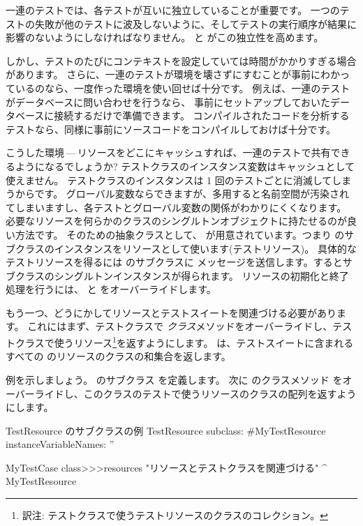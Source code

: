 \documentclass[a4paper,10pt,twoside]{book}
\begin{document}
一連のテストでは、各テストが互いに独立していることが重要です。
一つのテストの失敗が他のテストに波及しないように、そしてテストの実行順序が結果に影響のないようにしなければなりません。
 と  がこの独立性を高めます。

しかし、テストのたびにコンテキストを設定していては時間がかかりすぎる場合があります。
さらに、一連のテストが環境を壊さずにすむことが事前にわかっているのなら、一度作った環境を使い回せば十分です。
例えば、一連のテストがデータベースに問い合わせを行うなら、
事前にセットアップしておいたデータベースに接続するだけで準備できます。
コンパイルされたコードを分析するテストなら、同様に事前にソースコードをコンパイルしておけば十分です。

こうした環境\,---\,リソースをどこにキャッシュすれば、一連のテストで共有できるようになるでしょうか?
テストクラスのインスタンス変数はキャッシュとして使えません。
テストクラスのインスタンスは 1 回のテストごとに消滅してしまうからです。
グローバル変数ならできますが、多用すると名前空間が汚染されてしまいますし、各テストとグローバル変数の関係がわかりにくくなります。
必要なリソースを何らかのクラスのシングルトンオブジェクトに持たせるのが良い方法です。
そのための抽象クラスとして、 が用意されています。つまり  のサブクラスのインスタンスをリソースとして使います(テストリソース)。
具体的なテストリソースを得るには  のサブクラスに  メッセージを送信します。するとサブクラスのシングルトンインスタンスが得られます。
リソースの初期化と終了処理を行うには、 と  をオーバーライドします。

もう一つ、どうにかしてリソースとテストスイートを関連づける必要があります。
これにはまず、テストクラスで  \emph{クラス}メソッドをオーバーライドし、テストクラスで使うリソース\footnote{訳注: テストクラスで使うテストリソースのクラスのコレクション。}を返すようにします。
\ab{}
 は、テストスイートに含まれるすべての  のリソースのクラスの和集合を返します。

例を示しましょう。
 のサブクラス  を定義します。
次に  のクラスメソッド  をオーバーライドし、このクラスのテストで使うリソースのクラスの配列を返すようにします。

\begin{classdef}[mytestresource]{TestResource のサブクラスの例}
TestResource subclass: #MyTestResource
	instanceVariableNames: ''

MyTestCase class>>>resources
	"リソースとテストクラスを関連づける"
	^{ MyTestResource }
\end{classdef}
\end{document}
